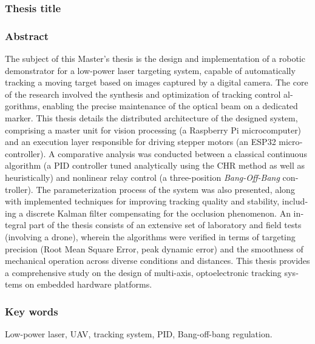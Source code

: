 \documentclass[a4paper,twoside,12pt]{book}
\begin{document}
\newpage
\subsubsection*{Thesis title} 
\begin{otherlanguage}{british}
\TitleAlt
\end{otherlanguage}

\subsubsection*{Abstract} 
\begin{otherlanguage}{british}
The subject of this Master's thesis is the design and implementation of a robotic demonstrator for a low-power laser targeting system, capable of automatically tracking a moving target based on images captured by a digital camera. The core of the research involved the synthesis and optimization of tracking control algorithms, enabling the precise maintenance of the optical beam on a dedicated marker. This thesis details the distributed architecture of the designed system, comprising a master unit for vision processing (a Raspberry Pi microcomputer) and an execution layer responsible for driving stepper motors (an ESP32 microcontroller). A comparative analysis was conducted between a classical continuous algorithm (a PID controller tuned analytically using the CHR method as well as heuristically) and nonlinear relay control (a three-position \textit{Bang-Off-Bang} controller). The parameterization process of the system was also presented, along with implemented techniques for improving tracking quality and stability, including a discrete Kalman filter compensating for the occlusion phenomenon. An integral part of the thesis consists of an extensive set of laboratory and field tests (involving a drone), wherein the algorithms were verified in terms of targeting precision (Root Mean Square Error, peak dynamic error) and the smoothness of mechanical operation across diverse conditions and distances. This thesis provides a comprehensive study on the design of multi-axis, optoelectronic tracking systems on embedded hardware platforms.

\end{otherlanguage}
\subsubsection*{Key words}  
\begin{otherlanguage}{british}
Low-power laser, UAV, tracking system, PID, Bang-off-bang regulation.
\end{otherlanguage}
\end{document}

